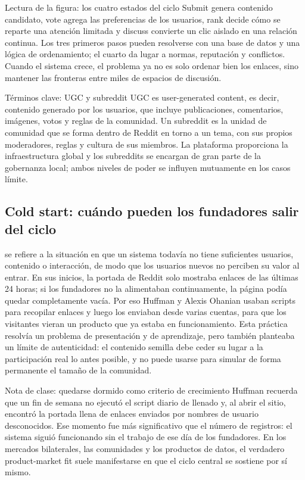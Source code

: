 \begin{knowledgebox}{Lectura de la figura: los cuatro estados del ciclo}
Submit genera contenido candidato, vote agrega las preferencias de los usuarios, rank decide cómo se reparte una atención limitada y discuss convierte un clic aislado en una relación continua. Los tres primeros pasos pueden resolverse con una base de datos y una lógica de ordenamiento; el cuarto da lugar a normas, reputación y conflictos. Cuando el sistema crece, el problema ya no es solo ordenar bien los enlaces, sino mantener las fronteras entre miles de espacios de discusión.
\end{knowledgebox}

\begin{importantbox}{Términos clave: UGC y subreddit}
UGC es user-generated content, es decir, contenido generado por los usuarios, que incluye publicaciones, comentarios, imágenes, votos y reglas de la comunidad. Un subreddit es la unidad de comunidad que se forma dentro de Reddit en torno a un tema, con sus propios moderadores, reglas y cultura de sus miembros. La plataforma proporciona la infraestructura global y los subreddits se encargan de gran parte de la gobernanza local; ambos niveles de poder se influyen mutuamente en los casos límite.
\end{importantbox}

\subsection{Cold start: cuándo pueden los fundadores salir del ciclo}

 se refiere a la situación en que un sistema todavía no tiene suficientes usuarios, contenido o interacción, de modo que los usuarios nuevos no perciben su valor al entrar. En sus inicios, la portada de Reddit solo mostraba enlaces de las últimas 24 horas; si los fundadores no la alimentaban continuamente, la página podía quedar completamente vacía. Por eso Huffman y Alexis Ohanian usaban scripts para recopilar enlaces y luego los enviaban desde varias cuentas, para que los visitantes vieran un producto que ya estaba en funcionamiento. Esta práctica resolvía un problema de presentación y de aprendizaje, pero también planteaba un límite de autenticidad: el contenido semilla debe ceder su lugar a la participación real lo antes posible, y no puede usarse para simular de forma permanente el tamaño de la comunidad.

\begin{knowledgebox}{Nota de clase: quedarse dormido como criterio de crecimiento}
Huffman recuerda que un fin de semana no ejecutó el script diario de llenado y, al abrir el sitio, encontró la portada llena de enlaces enviados por nombres de usuario desconocidos. Ese momento fue más significativo que el número de registros: el sistema siguió funcionando sin el trabajo de ese día de los fundadores. En los mercados bilaterales, las comunidades y los productos de datos, el verdadero product-market fit suele manifestarse en que el ciclo central se sostiene por sí mismo.
\end{knowledgebox}

